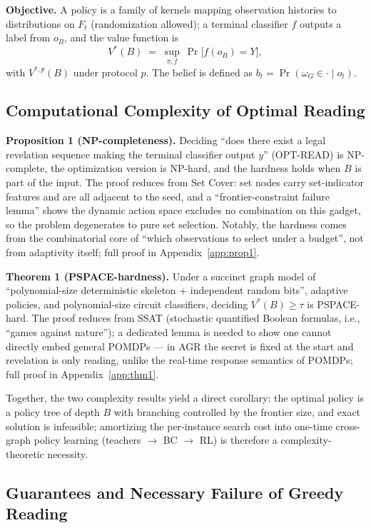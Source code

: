 \documentclass{article}
\begin{document}
\textbf{Objective.} A policy is a family of kernels mapping observation histories to distributions on $F_t$ (randomization allowed); a terminal classifier $f$ outputs a label from $o_B$, and the value function is
\[
V^*(B)\;=\;\sup_{\pi,f}\ \Pr\big[f(o_B)=Y\big],
\]
with $V^{*,p}(B)$ under protocol $p$. The belief is defined as $b_t=\Pr(\omega_G\in\cdot\mid o_t)$.

\subsection{Computational Complexity of Optimal Reading}
\label{subsec:complexity}

\textbf{Proposition 1 (NP-completeness).} Deciding ``does there exist a legal revelation sequence making the terminal classifier output $y$'' (OPT-READ) is NP-complete, the optimization version is NP-hard, and the hardness holds when $B$ is part of the input. The proof reduces from Set Cover: set nodes carry set-indicator features and are all adjacent to the seed, and a ``frontier-constraint failure lemma'' shows the dynamic action space excludes no combination on this gadget, so the problem degenerates to pure set selection. Notably, the hardness comes from the combinatorial core of ``which observations to select under a budget'', not from adaptivity itself; full proof in Appendix~\ref{app:prop1}.

\textbf{Theorem 1 (PSPACE-hardness).} Under a succinct graph model of ``polynomial-size deterministic skeleton + independent random bits'', adaptive policies, and polynomial-size circuit classifiers, deciding $V^*(B)\ge\tau$ is PSPACE-hard. The proof reduces from SSAT (stochastic quantified Boolean formulas, i.e., ``games against nature''); a dedicated lemma is needed to show one cannot directly embed general POMDPs --- in AGR the secret is fixed at the start and revelation is only reading, unlike the real-time response semantics of POMDPs; full proof in Appendix~\ref{app:thm1}.

Together, the two complexity results yield a direct corollary: the optimal policy is a policy tree of depth $B$ with branching controlled by the frontier size, and exact solution is infeasible; amortizing the per-instance search cost into one-time cross-graph policy learning (teachers $\to$ BC $\to$ RL) is therefore a complexity-theoretic necessity.

\subsection{Guarantees and Necessary Failure of Greedy Reading}
\label{subsec:greedy}
\end{document}
